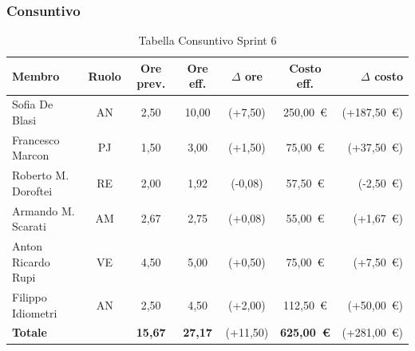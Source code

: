 \subsubsection{Consuntivo}
\begin{table}[H]
    \centering
    \renewcommand{\arraystretch}{1.3}
    \begin{tabularx}{\textwidth}{|X|c|c|c|c|c|r|}
        \hline
        \textbf{Membro} & \textbf{Ruolo} & \textbf{Ore prev.} &
        \textbf{Ore eff.} & \textbf{$\Delta$ ore} &
        \textbf{Costo eff.} & \textbf{$\Delta$ costo} \\
        \hline
        Sofia De Blasi       & AN & 2,50 & 10,00 & {\color{red}(+7,50)}  & 250{,}00~\euro & {\color{red}(+187{,}50~\euro)} \\
        Francesco Marcon     & PJ & 1,50 & 3,00 & {\color{red}(+1,50)} & 75{,}00~\euro & {\color{red}(+37{,}50~\euro)} \\
        Roberto M. Doroftei  & RE & 2,00 & 1,92 & {\color{green}(-0,08)} & 57{,}50~\euro & {\color{green}(-2{,}50~\euro)} \\
        Armando M. Scarati   & AM & 2,67 & 2,75 & {\color{red}(+0,08)} & 55{,}00~\euro & {\color{red}(+1{,}67~\euro)} \\
        Anton Ricardo Rupi   & VE & 4,50 & 5,00 & {\color{red}(+0,50)} & 75{,}00~\euro & {\color{red}(+7{,}50~\euro)} \\
        Filippo Idiometri    & AN & 2,50 & 4,50 & {\color{red}(+2,00)} & 112{,}50~\euro & {\color{red}(+50{,}00~\euro)} \\
        \hline
        \textbf{Totale} & & \textbf{15,67} & \textbf{27,17} & {\color{red}(+11,50)} & \textbf{625{,}00~\euro} & {\color{red}(+281{,}00~\euro)} \\
        \hline
    \end{tabularx}
    \caption{Tabella Consuntivo Sprint 6}
\end{table}

